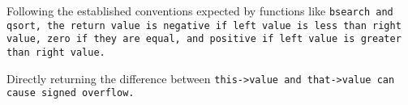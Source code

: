 Following the established conventions expected by functions like
\tt{bsearch} and \tt{qsort}, the return value is negative if
left value is less than right value, zero if they are equal,
and positive if left value is greater than right value.

\note Directly returning the difference between \tt{this->value}
and \tt{that->value} can cause signed overflow.
